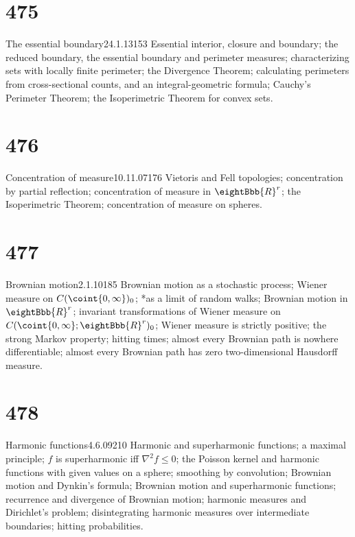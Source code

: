 \ifdim\pagewidth>467pt\fontdimen3\tenrm=2pt\fi

\section{475}{The essential boundary}{24.1.13}{153}{}
{Essential interior, closure and boundary;  the reduced boundary, the
essential boundary and perimeter measures;  
characterizing sets with locally finite perimeter;
the Divergence Theorem;   calculating perimeters from cross-sectional
counts, and an integral-geometric formula;  
Cauchy's Perimeter Theorem;  the Isoperimetric Theorem for
convex sets.}

\tenrm=1.67pt

\section{476}{Concentration of measure}{10.11.07}{176}{}
{Vietoris and Fell topologies;  concentration by partial
reflection;  concentration of measure in $\eightBbb{R}^r$;
the Isoperimetric
Theorem;  concentration of measure on spheres.}

\section{477}{Brownian motion}{2.1.10}{185}{}
{Brownian motion as a stochastic process;  Wiener measure on
$C(\coint{0,\infty})_0$;  *as a limit of random walks;
Brownian motion in $\eightBbb{R}^r$;   invariant
transformations of Wiener measure on
$C(\coint{0,\infty};\eightBbb{R}^r)_0$;  Wiener measure is strictly
positive;  the strong Markov property;  hitting times;  almost every
Brownian path is nowhere differentiable;  almost every Brownian path has
zero two-dimensional Hausdorff measure.}

\section{478}{Harmonic functions}{4.6.09}{210}{}
{Harmonic and superharmonic functions;  a maximal principle;  $f$ is
superharmonic iff $\nabla^2f\le0$;  the Poisson kernel and
harmonic functions
with given values on a sphere;  smoothing by convolution;  Brownian motion
and Dynkin's formula;  Brownian motion and superharmonic functions;
recurrence and divergence of Brownian motion;
harmonic measures and Dirichlet's problem;  disintegrating harmonic
measures over intermediate boundaries;  hitting probabilities.}

